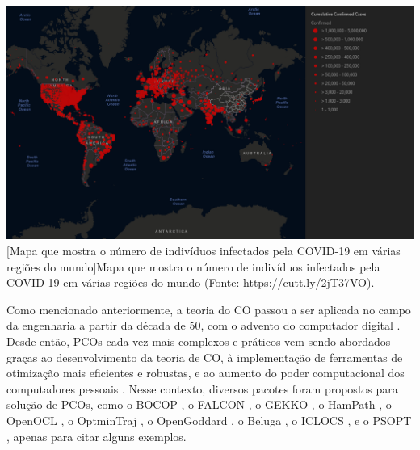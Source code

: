 \noindent	
\begin{minipage}{\textwidth}
	\vspace{\onelineskip}
	\centering
	\includegraphics[width=1\linewidth]{fig/introducao/mapaCovid}
	[Mapa que mostra o número de indivíduos infectados pela COVID-19 em várias regiões do mundo]{Mapa que mostra o número de indivíduos infectados pela COVID-19 em várias regiões do mundo (Fonte: \url{https://cutt.ly/2jT37VO}).}
	\label{fig:introducao:espalhamentoCOVID}
	\vspace{\onelineskip}
\end{minipage}


Como mencionado anteriormente, a teoria do CO passou a ser aplicada no campo da engenharia a partir da década de 50, com o advento do computador digital \cite{bryson_optimal_1996}. Desde então, PCOs cada vez mais complexos e práticos vem sendo abordados graças ao desenvolvimento da teoria de CO, à implementação de ferramentas de otimização mais eficientes e robustas, e ao aumento do poder computacional dos computadores pessoais \cite{biral_notes_2016}. Nesse contexto, diversos pacotes foram propostos para solução de PCOs, como o BOCOP \cite{saclay_bocop_2017}, o FALCON \cite{rieck_falconm_2020}, o GEKKO \cite{beal_gekko_2018}, o HamPath \cite{caillau_differential_2012}, o OpenOCL \cite{koenemann_openoclopen_2017}, o OptminTraj \cite{kelly_optimtraj_2018}, o OpenGoddard \cite{interstellar_technologies_inc_opengoddard_2020}, o Beluga \cite{rapid_design_of_systems_laboratory_beluga_2021}, o ICLOCS \cite{falugi_iclocs2_2018}, e o PSOPT \cite{becerra_psopt_2019}, apenas para citar alguns exemplos. 

